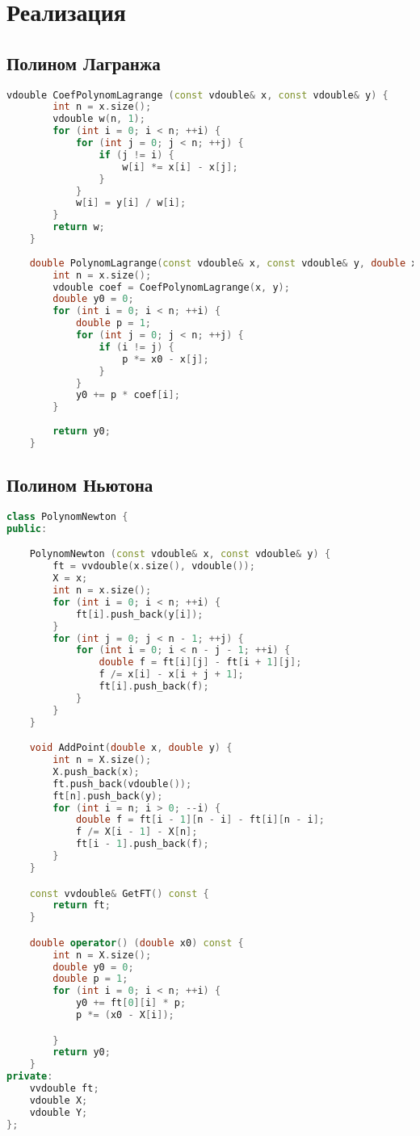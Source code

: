 \section*{Реализация}

\subsection*{Полином Лагранжа}

\begin{lstlisting}[language=C++]
    vdouble CoefPolynomLagrange (const vdouble& x, const vdouble& y) {
        int n = x.size();
        vdouble w(n, 1);
        for (int i = 0; i < n; ++i) {
            for (int j = 0; j < n; ++j) {
                if (j != i) {
                    w[i] *= x[i] - x[j];
                }
            }
            w[i] = y[i] / w[i];
        }
        return w;
    }
    
    double PolynomLagrange(const vdouble& x, const vdouble& y, double x0) {
        int n = x.size();
        vdouble coef = CoefPolynomLagrange(x, y);
        double y0 = 0;
        for (int i = 0; i < n; ++i) {
            double p = 1;
            for (int j = 0; j < n; ++j) {
                if (i != j) {
                    p *= x0 - x[j];
                }
            }
            y0 += p * coef[i];
        }
    
        return y0;
    }
\end{lstlisting}

\subsection*{Полином Ньютона}

\begin{lstlisting}[language=C++]
class PolynomNewton {
public:

    PolynomNewton (const vdouble& x, const vdouble& y) {
        ft = vvdouble(x.size(), vdouble());
        X = x;
        int n = x.size();
        for (int i = 0; i < n; ++i) {
            ft[i].push_back(y[i]);
        }
        for (int j = 0; j < n - 1; ++j) {
            for (int i = 0; i < n - j - 1; ++i) {
                double f = ft[i][j] - ft[i + 1][j];
                f /= x[i] - x[i + j + 1];
                ft[i].push_back(f);
            }
        }
    }

    void AddPoint(double x, double y) {
        int n = X.size();
        X.push_back(x);
        ft.push_back(vdouble());
        ft[n].push_back(y);
        for (int i = n; i > 0; --i) {
            double f = ft[i - 1][n - i] - ft[i][n - i];
            f /= X[i - 1] - X[n];
            ft[i - 1].push_back(f);
        }
    }

    const vvdouble& GetFT() const {
        return ft;
    }

    double operator() (double x0) const {
        int n = X.size();
        double y0 = 0;
        double p = 1;
        for (int i = 0; i < n; ++i) {
            y0 += ft[0][i] * p;
            p *= (x0 - X[i]);

        }
        return y0;
    }
private:
    vvdouble ft;
    vdouble X;
    vdouble Y;
};
\end{lstlisting}
\pagebreak